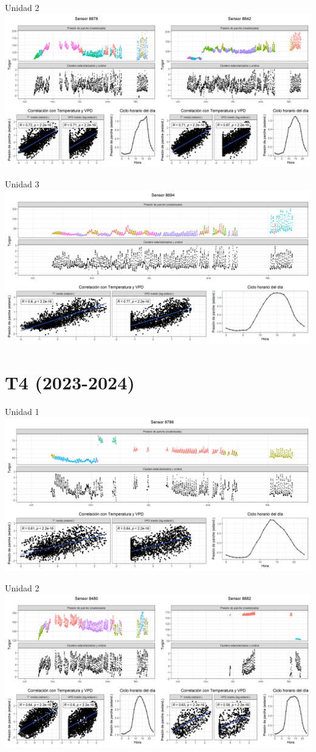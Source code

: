 \documentclass[
  letterpaper,
  DIV=11,
  numbers=noendperiod]{scrreprt}
\begin{document}
Unidad 2
\includegraphics{figuras/03_turgor_union/2023_2024_La_Esperanza_T3_Unidad_2.png}

Unidad 3
\includegraphics{figuras/03_turgor_union/2023_2024_La_Esperanza_T3_Unidad_3.png}

\chapter{T4 (2023-2024)}

Unidad 1
\includegraphics{figuras/03_turgor_union/2023_2024_La_Esperanza_T4_Unidad_1.png}

Unidad 2
\includegraphics{figuras/03_turgor_union/2023_2024_La_Esperanza_T4_Unidad_2.png}
\end{document}
